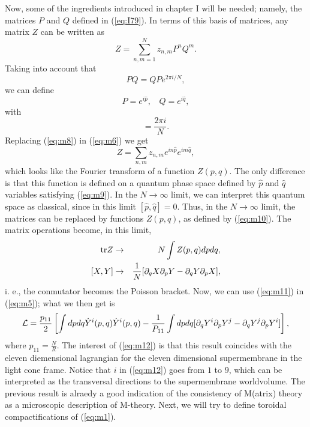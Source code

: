 Now, some of the ingredients introduced in chapter I will be needed; namely, the matrices 
$P$ and $Q$ defined in (\ref{eq:I79}). In terms of this basis of matrices, 
any matrix $Z$ can be written as
\begin{equation}
Z= \sum_{n,m=1}^N z_{n,m} P^n Q^m.
\label{eq:m6}
\end{equation}
Taking into account that 
\begin{equation}
PQ = QP e^{2 \pi i/N},
\label{eq:m7}
\end{equation}
we can define 
\begin{equation}
P= e^{i \hat{p}}, \: \: \: \: Q=e^{i \hat{q}},
\label{eq:m8}
\end{equation}
with 
\begin{equation}
[\hat{p},\hat{q}] = \frac {2 \pi i}{N}.
\label{eq:m9}
\end{equation}
Replacing (\ref{eq:m8}) in (\ref{eq:m6}) we get
\begin{equation}
Z = \sum_{n,m} z_{n,m} e^{in \hat{p}} e^{im \hat{q}},
\label{eq:m10}
\end{equation}
which looks like the Fourier transform of a function $Z(p,q)$. The only 
difference is that this function is defined on a quantum phase space defined 
by $\hat{p}$ and $\hat{q}$ variables satisfying (\ref{eq:m9}). In the 
$N \rightarrow \infty$ limit, we can interpret this quantum space as 
classical, since in this limit $[\hat{p},\hat{q}]=0$. Thus, in the 
$N \rightarrow \infty$ limit, the matrices can be replaced by functions 
$Z(p,q)$, as defined by (\ref{eq:m10}). The matrix operations become, 
in this limit,
\begin{eqnarray}
\hbox {tr} Z & \rightarrow & N \int Z(p,q) dp dq, \nonumber \\
{[}X,Y{]} & \rightarrow & \frac {1}{N} [ \partial_q X \partial_p Y- \partial_q Y 
\partial_p X ],
\label{eq:m11}
\end{eqnarray} 
i. e., the conmutator becomes the Poisson bracket. Now, we can use 
(\ref{eq:m11}) in (\ref{eq:m5}); what we then get is
\begin{equation}
{\cal L} = \frac {p_{11}}{2} \left[ \int dp dq \dot{Y}^{i}(p,q) \dot{Y}^{i}(p,q) 
- \frac {1}{P_{11}} \int dp dq [ \partial_q Y^{i} \partial_p Y^{j} - 
\partial_{q} Y^{j} \partial_p Y^{i}] \right],
\label{eq:m12}
\end{equation}
where $p_{11}= \frac {N}{R}$. The interest of (\ref{eq:m12}) is that this result 
coincides with the eleven diemensional lagrangian for the eleven dimensional 
supermembrane in the light cone frame. Notice that $i$ in (\ref{eq:m12}) goes from 
$1$ to $9$, which can be interpreted as the transversal directions to the 
supermembrane worldvolume. The previous result is alraedy a good indication 
of the consistency of M(atrix) theory as a microscopic description of M-theory. 
Next, we will try to define toroidal compactifications of (\ref{eq:m1}).


